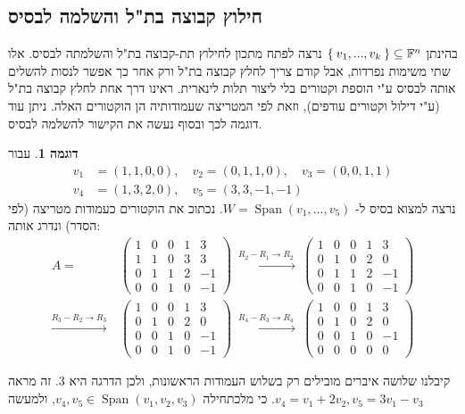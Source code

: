 \documentclass[12pt]{report}
\theoremstyle{plain}
\theoremstyle{definition}
\newtheorem{example}{דוגמה}[chapter]
\newcommand{\F}{\mathbb{F}}
\newcommand{\0}{\mathbf{0}}
\DeclareMathOperator{\Span}{Span}
\begin{document}
\subsection{חילוץ קבוצה בת"ל והשלמה לבסיס}\label{sub:extraction}

בהינתן 
$\Set{v_1,...,v_k}\subseteq\F^n$
נרצה לפתח מתכון לחילוץ תת-קבוצה בת"ל והשלמתה לבסיס. אלו שתי משימות נפרדות, אבל קודם צריך לחלץ קבוצה בת"ל ורק אחר כך אפשר לנסות להשלים אותה לבסיס ע"י הוספת וקטורים בלי ליצור תלות לינארית. ראינו דרך אחת לחלץ קבוצה בת"ל (ע"י דילול וקטורים עודפים), וזאת לפי המטריצה שעמודותיה הן הוקטורים האלה. ניתן עוד דוגמה לכך ובסוף נעשה את הקישור להשלמה לבסיס.

\begin{example}
עבור
$$
\begin{aligned}
v_1&=(1,1,0,0),\quad v_2=(0,1,1,0),\quad v_3=(0,0,1,1) \\
v_4&=(1,3,2,0),\quad v_5=(3,3,-1,-1)
\end{aligned}
$$
נרצה למצוא בסיס ל-
$W=\Span(v_1,...,v_5)$.
נכתוכ את הוקטורים כעמודות מטריצה (לפי הסדר) ונדרג אותה:
$$ 
\begin{aligned}
A=&\begin{pmatrix}
1&0&0&1&3\\
1&1&0&3&3\\
0&1&1&2&-1\\
0&0&1&0&-1
\end{pmatrix}
\ \xrightarrow{R_2-R_1\to R_2\ }\
\begin{pmatrix}
1&0&0&1&3\\
0&1&0&2&0\\
0&1&1&2&-1\\
0&0&1&0&-1
\end{pmatrix} \\
\xrightarrow{R_3-R_2\to R_3 }\
&\begin{pmatrix}
1&0&0&1&3\\
0&1&0&2&0\\
0&0&1&0&-1\\
0&0&1&0&-1
\end{pmatrix}
\ \xrightarrow{R_4-R_3\to R_4\ }\
\begin{pmatrix}
1&0&0&1&3\\
0&1&0&2&0\\
0&0&1&0&-1\\
0&0&0&0&0
\end{pmatrix}
\end{aligned}
$$

 קיבלנו שלושה איברים מובילים רק בשלוש העמודות הראשונות, ולכן הדרגה היא 
 $3$.
 זה מראה כי מלכתחילה
$v_4,v_5\in\Span(v_1,v_2,v_3)$,
ולמעשה
$
.v_4=v_1+2v_2, v_5=3v_1-v_3
$


\end{example}
\end{document}

